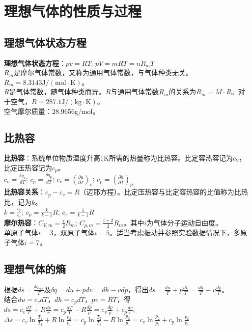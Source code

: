 \documentclass[a4paper,9pt]{ctexart}
\begin{document}
\section{理想气体的性质与过程}
\subsection{理想气体状态方程}
\noindent
\textbf{理想气体状态方程}：$pv=RT$; $pV=mRT=nR_mT$\\
$R_m$是摩尔气体常数，又称为通用气体常数，与气体种类无关。$R_m=8.3143\mathrm{J/(mol\cdot K)}$。\\
$R$是气体常数，随气体种类而异。$R$与通用气体常数$R_m$的关系为$R_m=M\cdot R$。对于空气，$R=287.1\mathrm{J/(kg\cdot K)}$。\\
空气摩尔质量：28.9656g/mol。

\subsection{比热容}
\noindent
\textbf{比热容}：系统单位物质温度升高1K所需的热量称为比热容。比定容热容记为$c_V$，比定压热容记为$c_p$。\\
$c_v=\frac{\delta q_v}{dT}$; $c_p=\frac{\delta q_p}{dT}$; 
$c_v=\left(\frac{\partial u}{\partial T}\right)_v$; $c_p=\left(\frac{\partial h}{\partial T}\right)_p$\\
\textbf{比热容关系}：$c_p-c_v=R$（迈耶方程）。比定压热容与比定容热容的比值称为比热比，记为$k$。\\
$k=\frac{c_p}{c_v}$; $c_p=\frac{k}{k-1}R$; $c_v=\frac{1}{k-1}R$\\
\textbf{摩尔热容}：$C_{V,m}=\frac{i}{2}R_m$; $C_{p,m}=\frac{i+2}{2}R_m$。其中$i$为气体分子运动自由度。\\
单原子气体$i=3$，双原子气体$i=5$。适当考虑振动并参照实验数据情况下，多原子气体$i=7$。

\subsection{理想气体的熵}
\noindent
根据$ds=\frac{\delta q_{rev}}{T}$及$\delta q=du+pdv=dh-vdp$，得出$ds=\frac{du}{T}+p\frac{dv}{T}=\frac{dh}{T}-v\frac{dp}{T}$。\\
结合$du=c_vdT$，$dh=c_pdT$，$pv=RT$，得$ds=c_v\frac{dT}{T}+R\frac{dv}{v}=c_p\frac{dT}{T}-R\frac{dp}{p}=c_v\frac{dp}{p}+c_p\frac{dv}{v}$;\\
 $\Delta s=c_v\ln\frac{T_2}{T_1}+R\ln\frac{v_2}{v_1}=c_p\ln\frac{T_2}{T_1}-R\ln\frac{p_2}{p_1}=c_v\ln\frac{p_2}{p_1}+c_p\ln\frac{v_2}{v_1}$
\end{document}
